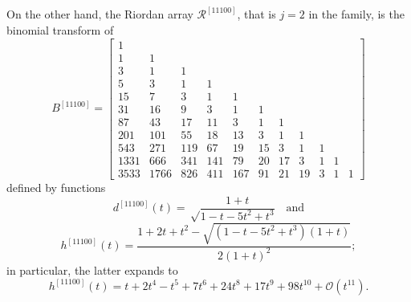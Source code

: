 On the other hand, the Riordan array $\mathcal{R}^{[11100]}$, that is $j=2$ in
the family, is the binomial transform of
\begin{displaymath}
B^{[11100]} =\left[\begin{array}{ccccccccccc}1 &  &  &  &  &  &  &  &  &  & \\1 & 1 &  &  &  &  &  &  &  &  & \\3 & 1 & 1 &  &  &  &  &  &  &  & \\5 & 3 & 1 & 1 &  &  &  &  &  &  & \\15 & 7 & 3 & 1 & 1 &  &  &  &  &  & \\31 & 16 & 9 & 3 & 1 & 1 &  &  &  &  & \\87 & 43 & 17 & 11 & 3 & 1 & 1 &  &  &  & \\201 & 101 & 55 & 18 & 13 & 3 & 1 & 1 &  &  & \\543 & 271 & 119 & 67 & 19 & 15 & 3 & 1 & 1 &  & \\1331 & 666 & 341 & 141 & 79 & 20 & 17 & 3 & 1 & 1 & \\3533 & 1766 & 826 & 411 & 167 & 91 & 21 & 19 & 3 & 1 & 1\end{array}\right]
\end{displaymath}
defined by functions
\begin{displaymath}
d^{[11100]}(t)=\sqrt\frac{1+t}{1-t-5t^{2}+t^{3}} \quad \text{and}
\end{displaymath}
\begin{displaymath}
h^{[11100]}(t)=\frac{1+2t+t^{2}-\sqrt{(1-t-5t^{2}+t^{3})(1+t)}}{2(1+t)^{2}};
\end{displaymath}
in particular, the latter expands to
\begin{displaymath}
h^{[11100]}(t)=t + 2 t^{4} - t^{5} + 7 t^{6} + 24 t^{8} + 17 t^{9} + 98 t^{10} +
\mathcal{O}\left(t^{11}\right).
\end{displaymath}

\iffalse
Furthermore, the Riordan array $\mathcal{R}^{[1111000]}$, that is $j=3$ in the
family, is the binomial transform of
\begin{displaymath}
B^{[1111000]} =\left[\begin{array}{ccccccccccc}1 &  &  &  &  &  &  &  &  &  & \\1 & 1 &  &  &  &  &  &  &  &  & \\3 & 1 & 1 &  &  &  &  &  &  &  & \\7 & 4 & 1 & 1 &  &  &  &  &  &  & \\17 & 8 & 5 & 1 & 1 &  &  &  &  &  & \\49 & 25 & 9 & 6 & 1 & 1 &  &  &  &  & \\123 & 61 & 34 & 10 & 7 & 1 & 1 &  &  &  & \\351 & 176 & 74 & 44 & 11 & 8 & 1 & 1 &  &  & \\945 & 472 & 242 & 88 & 55 & 12 & 9 & 1 & 1 &  & \\2641 & 1321 & 610 & 322 & 103 & 67 & 13 & 10 & 1 & 1 & \\7363 & 3681 & 1811 & 766 & 417 & 119 & 80 & 14 & 11 & 1 & 1\end{array}\right]
\end{displaymath}
\fi

